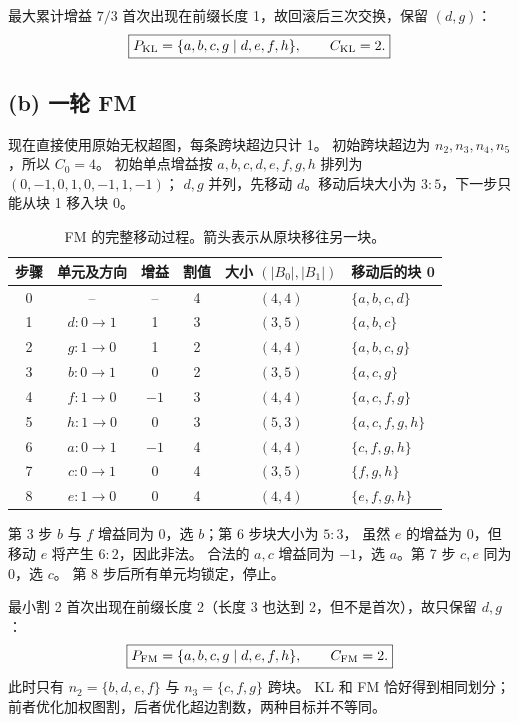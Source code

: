 \documentclass[UTF8,a4paper,11pt,fontset=fandol]{ctexart}
\begin{document}
最大累计增益 $7/3$ 首次出现在前缀长度 1，故回滚后三次交换，保留 $(d,g)$：
\[
\boxed{P_{\rm KL}=\{a,b,c,g\mid d,e,f,h\},\qquad C_{\rm KL}=2.}
\]

\clearpage
\subsection{(b) 一轮 FM}
现在直接使用原始无权超图，每条跨块超边只计 1。
初始跨块超边为 $n_2,n_3,n_4,n_5$，所以 $C_0=4$。
初始单点增益按 $a,b,c,d,e,f,g,h$ 排列为 $(0,-1,0,1,0,-1,1,-1)$；
$d,g$ 并列，先移动 $d$。移动后块大小为 $3:5$，下一步只能从块 1 移入块 0。

\begin{table}[H]\centering
\caption{FM 的完整移动过程。箭头表示从原块移往另一块。}
\begin{tabular}{cccccl}
\toprule
步骤 & 单元及方向 & 增益 & 割值 & 大小 $(|B_0|,|B_1|)$ & 移动后的块 0 \\\midrule
0 & -- & -- & 4 & $(4,4)$ & $\{a,b,c,d\}$ \\
1 & $d:0\to1$ & 1 & 3 & $(3,5)$ & $\{a,b,c\}$ \\
2 & $g:1\to0$ & 1 & 2 & $(4,4)$ & $\{a,b,c,g\}$ \\
3 & $b:0\to1$ & 0 & 2 & $(3,5)$ & $\{a,c,g\}$ \\
4 & $f:1\to0$ & $-1$ & 3 & $(4,4)$ & $\{a,c,f,g\}$ \\
5 & $h:1\to0$ & 0 & 3 & $(5,3)$ & $\{a,c,f,g,h\}$ \\
6 & $a:0\to1$ & $-1$ & 4 & $(4,4)$ & $\{c,f,g,h\}$ \\
7 & $c:0\to1$ & 0 & 4 & $(3,5)$ & $\{f,g,h\}$ \\
8 & $e:1\to0$ & 0 & 4 & $(4,4)$ & $\{e,f,g,h\}$ \\\bottomrule
\end{tabular}
\end{table}
第 3 步 $b$ 与 $f$ 增益同为 0，选 $b$；第 6 步块大小为 $5:3$，
虽然 $e$ 的增益为 0，但移动 $e$ 将产生 $6:2$，因此非法。
合法的 $a,c$ 增益同为 $-1$，选 $a$。第 7 步 $c,e$ 同为 0，选 $c$。
第 8 步后所有单元均锁定，停止。

最小割 2 首次出现在前缀长度 2（长度 3 也达到 2，但不是首次），故只保留 $d,g$：
\[
\boxed{P_{\rm FM}=\{a,b,c,g\mid d,e,f,h\},\qquad C_{\rm FM}=2.}
\]
此时只有 $n_2=\{b,d,e,f\}$ 与 $n_3=\{c,f,g\}$ 跨块。
KL 和 FM 恰好得到相同划分；前者优化加权图割，后者优化超边割数，两种目标并不等同。
\end{document}
